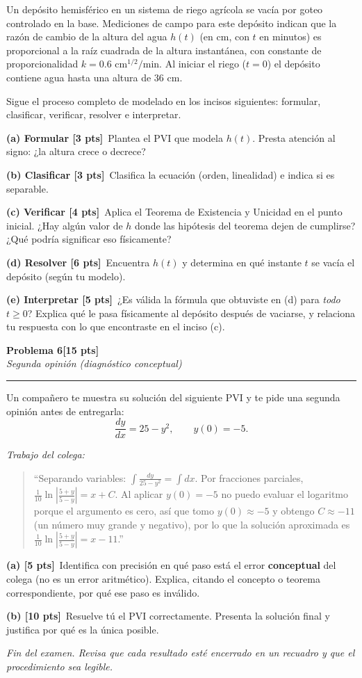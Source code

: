 \documentclass[11pt,letterpaper]{article}
\newcommand{\problema}[3]{%
  \bigskip\bigskip\noindent
  {\Large\textbf{Problema #1}}\hfill\textbf{[#2 pts]}\\[3pt]
  {\small\itshape #3}\par
  \vspace{2pt}\hrule\vspace{8pt}
}
\newcommand{\subparte}[2]{%
  \medskip\noindent\textbf{(#1}\ #2\par
}
\begin{document}
Un depósito hemisférico en un sistema de riego agrícola se vacía por goteo controlado en la base. Mediciones de campo para este depósito indican que la razón de cambio de la altura del agua $h(t)$ (en cm, con $t$ en minutos) es proporcional a la raíz cuadrada de la altura instantánea, con constante de proporcionalidad $k = 0.6 \text{ cm}^{1/2}/\text{min}$. Al iniciar el riego ($t=0$) el depósito contiene agua hasta una altura de $36$ cm.

Sigue el proceso completo de modelado en los incisos siguientes: formular, clasificar, verificar, resolver e interpretar.

\subparte{a) Formular [3 pts]}{Plantea el PVI que modela $h(t)$. Presta atención al signo: ¿la altura crece o decrece?}

\subparte{b) Clasificar [3 pts]}{Clasifica la ecuación (orden, linealidad) e indica si es separable.}

\subparte{c) Verificar [4 pts]}{Aplica el Teorema de Existencia y Unicidad en el punto inicial. ¿Hay algún valor de $h$ donde las hipótesis del teorema dejen de cumplirse? ¿Qué podría significar eso físicamente?}

\subparte{d) Resolver [6 pts]}{Encuentra $h(t)$ y determina en qué instante $t$ se vacía el depósito (según tu modelo).}

\subparte{e) Interpretar [5 pts]}{¿Es válida la fórmula que obtuviste en (d) para \emph{todo} $t \geq 0$? Explica qué le pasa físicamente al depósito después de vaciarse, y relaciona tu respuesta con lo que encontraste en el inciso (c).}


\problema{6}{15}{Segunda opinión (diagnóstico conceptual)}

Un compañero te muestra su solución del siguiente PVI y te pide una segunda opinión antes de entregarla:
\[
\frac{dy}{dx} = 25-y^2, \qquad y(0) = -5.
\]

\textit{Trabajo del colega:}
\begin{quote}
\small
``Separando variables: $\displaystyle\int \frac{dy}{25-y^2} = \int dx$. Por fracciones parciales, $\displaystyle \frac{1}{10}\ln\left|\frac{5+y}{5-y}\right| = x + C$. Al aplicar $y(0)=-5$ no puedo evaluar el logaritmo porque el argumento es cero, así que tomo $y(0) \approx -5$ y obtengo $C \approx -11$ (un número muy grande y negativo), por lo que la solución aproximada es $\displaystyle\frac{1}{10}\ln\left|\frac{5+y}{5-y}\right| = x - 11$.''
\end{quote}

\subparte{a) [5 pts]}{Identifica con precisión en qué paso está el error \textbf{conceptual} del colega (no es un error aritmético). Explica, citando el concepto o teorema correspondiente, por qué ese paso es inválido.}

\subparte{b) [10 pts]}{Resuelve tú el PVI correctamente. Presenta la solución final y justifica por qué es la única posible.}

\vfill
\begin{center}\small\textit{Fin del examen. Revisa que cada resultado esté encerrado en un recuadro y que el procedimiento sea legible.}\end{center}
\end{document}
